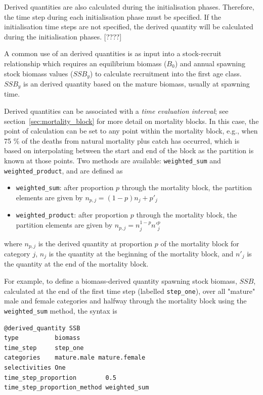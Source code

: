Derived quantities are also calculated during the initialisation phases. Therefore, the time step during each initialisation phase must be specified. If the initialisation time steps are not specified, the derived quantity will be calculated during the initialisation phases. [????]

A common use of an derived quantities is as input into a stock-recruit relationship  which requires an equilibrium biomass ($B_0$) and annual spawning stock biomass values ($SSB_y$) to calculate recruitment into the first age class. $SSB_y$ is an derived quantity based on the mature biomass, usually at spawning time. 

Derived quantities can be associated with a \textit{time evaluation interval}; see section~\ref{sec:mortality_block} for more detail on mortality blocks. In this case, the point of calculation can be set to any point within the mortality block, e.g., when 75 \% of the deaths from natural mortality plus catch has occurred, which is based on interpolating between the start and end of the block as the partition is known at those points.  Two  methods are available: \texttt{weighted\_sum} and \texttt{weighted\_product}, and are defined as

\begin{itemize}
	\item \texttt{weighted\_sum}: after proportion $p$ through the mortality block, the partition elements are given by $n_{p,j} = (1 - p)n_j + p'_j$

	\item \texttt{weighted\_product}: after proportion $p$ through the mortality block, the partition elements are given by $n_{p,j} = n_j^{1-p} n'^p_j$
\end{itemize}

where $n_{p,j}$ is the derived quantity at proportion $p$ of the mortality block for category $j$, $n_j$ is the quantity at the beginning of the mortality block, and $n'_j$ is the quantity at the end of the mortality block.

For example, to define a biomass-derived quantity spawning stock biomass, $SSB$, calculated at the end of the first time step (labelled \texttt{step\_one}), over all "mature" male and female categories and halfway through the mortality block using the \texttt{weighted\_sum} method, the syntax is

{\small{\begin{verbatim}
@derived_quantity SSB
type          biomass
time_step     step_one
categories    mature.male mature.female
selectivities One
time_step_proportion        0.5
time_step_proportion_method weighted_sum
\end{verbatim}}}

